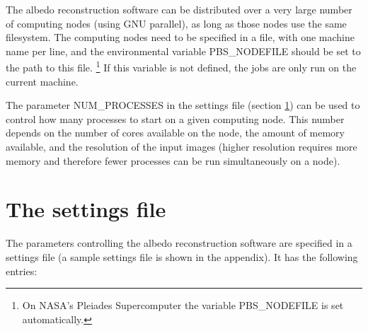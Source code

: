 \documentclass[letterpaper,fleqn,11pt]{report}
\begin{document}
The albedo reconstruction software can be distributed over a very large number of computing
nodes (using GNU parallel), as long as those nodes use the same filesystem. The
computing nodes need to be specified in a file, with one machine name
per line, and the environmental variable PBS\_NODEFILE should be set to
the path to this file. \footnote{On NASA's Pleiades Supercomputer the
variable PBS\_NODEFILE is set automatically.} If this variable is not defined, the jobs are
only run on the current machine. 
 
The parameter NUM\_PROCESSES in the settings file (section \ref{settings}) can be used
to control how many processes to start on a given computing node. This number depends
on the number of cores available on the node, the amount of memory available, and the resolution of the input images
(higher resolution requires more memory and therefore fewer processes can be run simultaneously on a node).

\section{The settings file}\label{settings}

The parameters controlling the albedo reconstruction software are specified in a
settings file (a sample settings file is shown in the appendix). It has the following entries:
\end{document}
